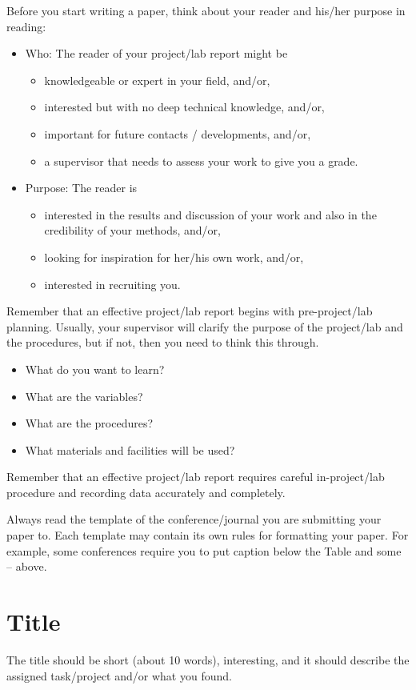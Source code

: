 \documentclass[10pt,conference,compsocconf]{IEEEtran}
\begin{document}
Before you start writing  a paper, think about your reader and his/her purpose in reading:
\begin{itemize}
	\item Who: The reader of your project/lab report might be
	\begin{itemize}
		\item knowledgeable or expert in your field, and/or,
		\item interested but with no deep technical knowledge, and/or,
		\item important for future contacts / developments, and/or,
		\item a supervisor that needs to assess your work to give you a grade.
	\end{itemize}
	\item Purpose: The reader is
	\begin{itemize}
		\item interested in the results and discussion of your work and also in the credibility of your methods, and/or,
		\item looking for inspiration for her/his own work, and/or,
		\item interested in recruiting you.
	\end{itemize}
\end{itemize}

Remember that an effective project/lab report begins with pre-project/lab planning. Usually, your supervisor will clarify the purpose of the project/lab and the procedures, but if not, then you need to think this through. 
\begin{itemize}
	\item What do you want to learn?
	\item What are the variables?
	\item What are the procedures?
	\item What materials and facilities will be used?
\end{itemize}

Remember that an effective project/lab report requires careful in-project/lab procedure and recording data accurately and completely.

Always read the template of the conference/journal you are submitting your paper to. Each template may contain its own rules for formatting your paper. For example, some conferences require you to put caption below the Table and some -- above.

\section*{Title}
The title should be short (about 10 words), interesting, and it should describe the assigned task/project and/or what you found.
\end{document}
